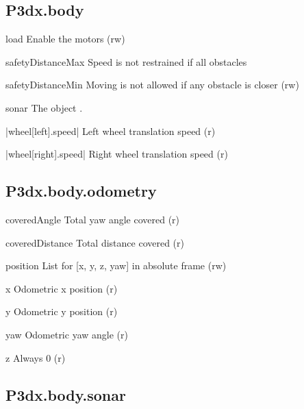\subsection{P3dx.body}

\begin{urbiscriptapi}
\item[load] Enable the motors (rw)


\item[safetyDistanceMax] Speed is not restrained if all obstacles


\item[safetyDistanceMin] Moving is not allowed if any obstacle is closer
  (rw)


\item[sonar] The object .


\item|wheel[left].speed| Left wheel translation speed (r)


\item|wheel[right].speed| Right wheel translation speed (r)
\end{urbiscriptapi}


\subsection{P3dx.body.odometry}
\begin{urbiscriptapi}
\item[coveredAngle] Total yaw angle covered (r)


\item[coveredDistance] Total distance covered (r)


\item[position] List for [x, y, z, yaw] in absolute frame (rw)


\item[x] Odometric x position (r)


\item[y] Odometric y position (r)


\item[yaw] Odometric yaw angle (r)


\item[z] Always 0 (r)
\end{urbiscriptapi}



\subsection{P3dx.body.sonar}

